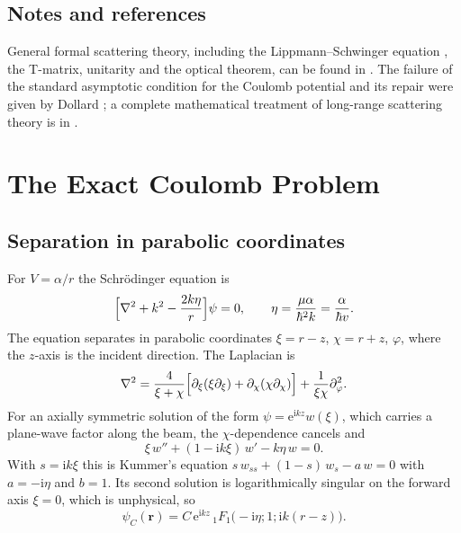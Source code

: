 \documentclass[11pt,a4paper]{book}
\numberwithin{equation}{chapter}
\newcommand{\ii}{\mathrm{i}}
\newcommand{\ee}{\mathrm{e}}
\newcommand{\vr}{\bm{r}}
\newcommand{\Fhyp}{{}_1F_1}
\begin{document}
\section*{Notes and references}
General formal scattering theory, including the Lippmann--Schwinger equation \cite{LS50}, the T-matrix, unitarity and the optical theorem, can be found in \cite{Newton,Taylor,GW,Messiah}. The failure of the standard asymptotic condition for the Coulomb potential and its repair were given by Dollard \cite{Dollard64}; a complete mathematical treatment of long-range scattering theory is in \cite{ReedSimonIII}.

\chapter{The Exact Coulomb Problem}

\section{Separation in parabolic coordinates}

For $V=\alpha/r$ the Schr\"odinger equation is
\begin{equation}\label{eq:coul-schr}
  \Bigl[\nabla^2+k^2-\frac{2k\eta}{r}\Bigr]\psi=0,\qquad
  \eta=\frac{\mu\alpha}{\hbar^2k}=\frac{\alpha}{\hbar v}.
\end{equation}
The equation separates in parabolic coordinates $\xi=r-z$, $\chi=r+z$,
$\varphi$, where the $z$-axis is the incident direction. The Laplacian is
\[
  \nabla^2=\frac{4}{\xi+\chi}\Bigl[\partial_\xi(\xi\partial_\xi)
  +\partial_\chi(\chi\partial_\chi)\Bigr]+\frac1{\xi\chi}\partial_\varphi^2 .
\]
For an axially symmetric solution of the form $\psi=\ee^{\ii kz}w(\xi)$, which
carries a plane-wave factor along the beam, the $\chi$-dependence cancels and
\begin{equation}\label{eq:kummer-w}
  \xi\,w''+(1-\ii k\xi)\,w'-k\eta\,w=0 .
\end{equation}
With $s=\ii k\xi$ this is Kummer's equation
$s\,w_{ss}+(1-s)\,w_s-a\,w=0$ with $a=-\ii\eta$ and $b=1$. Its second solution
is logarithmically singular on the forward axis $\xi=0$, which is unphysical,
so
\begin{equation}\label{eq:psiC}
  \psi_C(\vr)=C\,\ee^{\ii kz}\,\Fhyp\bigl(-\ii\eta;1;\ii k(r-z)\bigr).
\end{equation}
\end{document}
